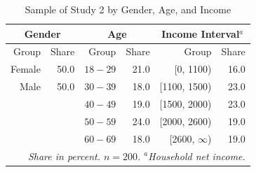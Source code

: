 \documentclass[egregdoesnotlikesansseriftitles]{scrartcl}
\begin{document}
\begin{table}[ht!]
\center
\caption{Sample of Study 2 by Gender, Age, and Income}
\label{tab:quota_study_2}
\begin{tabular}{rrrrrr}\\[0.5ex]
   \hline
   \multicolumn{2}{c}{Gender}   & \multicolumn{2}{c}{Age}   & \multicolumn{2}{c}{Income Interval$^a$}   \\
   \hline
   Group    & Share             & Group     & Share         & Group              & Share                \\
   \hline\hline
   Female   & 50.0              & $18-29$   & 21.0          &    [0, 1100)       & 16.0                 \\
   Male	    & 50.0              & $30-39$   & 18.0          & [1100, 1500)       & 23.0                 \\
            &                   & $40-49$   & 19.0          & [1500, 2000)       & 23.0                 \\
            &                   & $50-59$   & 24.0          & [2000, 2600)       & 19.0                 \\
            &                   & $60-69$   & 18.0          & [2600, $\infty$)   & 19.0                 \\
   \hline
   \multicolumn{6}{p{8cm}}{\footnotesize\textit{Share in percent. $n=200$. $^a$Household net income.}}
\end{tabular}
\end{table}
\end{document}
